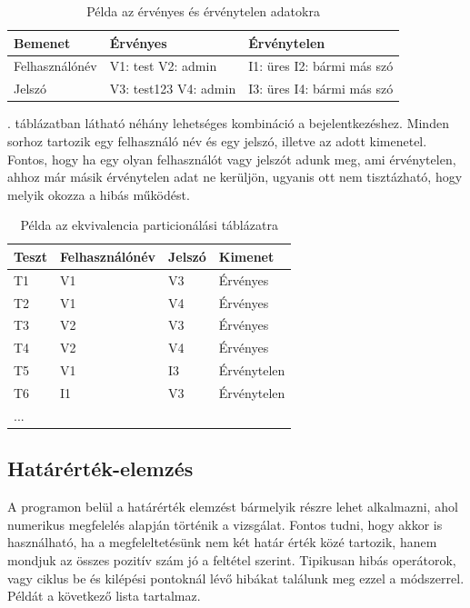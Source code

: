 \begin{table} [h]
	\begin{center}
		\label{table:ekvivalencia}
		\caption{Példa az érvényes és érvénytelen adatokra}
		\begin{tabular}{ | p{4cm} | p{4cm}|  p{4cm} |} 
			\hline
			Bemenet & Érvényes & Érvénytelen  \\ 
			\hline
			Felhasználónév & V1: test \newline V2: admin & I1: üres \newline I2: bármi más szó  \\ 
			\hline
			Jelszó & V3: test123 \newline V4: admin & I3: üres \newline I4: bármi más szó  \\ 
			\hline
		\end{tabular}
	\end{center}
\end{table}
\newpage
{}. táblázatban látható néhány lehetséges kombináció a bejelentkezéshez. Minden sorhoz tartozik egy felhasználó név és egy jelszó, illetve az adott kimenetel. Fontos, hogy ha egy olyan felhasználót vagy jelszót adunk meg, ami érvénytelen, ahhoz már másik érvénytelen adat ne kerüljön, ugyanis ott nem tisztázható, hogy melyik okozza a hibás működést.

\begin{table}[h]
	\caption{Példa az ekvivalencia particionálási táblázatra}
	\label{tab:tvv}
	\begin{center}
		\begin{tabular}{| p{3cm} | p{3cm} | p{3cm} | p{3cm} |}
			\hline
			Teszt & Felhasználónév & Jelszó & Kimenet \\
			\hline
			T1 & V1 & V3 & Érvényes \\
			\hline
			T2 & V1 & V4 & Érvényes \\
			\hline
			T3 & V2 & V3 & Érvényes \\
			\hline
			T4 & V2 & V4 & Érvényes \\
			\hline
			T5 & V1 & I3 & Érvénytelen \\
			\hline
			T6 & I1 & V3 & Érvénytelen \\
			\hline
			... & & & \\
			\hline
			\end{tabular}
	\end{center}
\end{table}

\subsection{Határérték-elemzés} A programon belül a határérték elemzést bármelyik részre lehet alkalmazni, ahol numerikus megfelelés alapján történik a vizsgálat. Fontos tudni, hogy akkor is használható, ha a megfeleltetésünk nem két határ érték közé tartozik, hanem mondjuk az összes pozitív szám jó a feltétel szerint. Tipikusan hibás operátorok, vagy ciklus be és kilépési pontoknál lévő hibákat találunk meg ezzel a módszerrel. Példát a következő lista tartalmaz.

